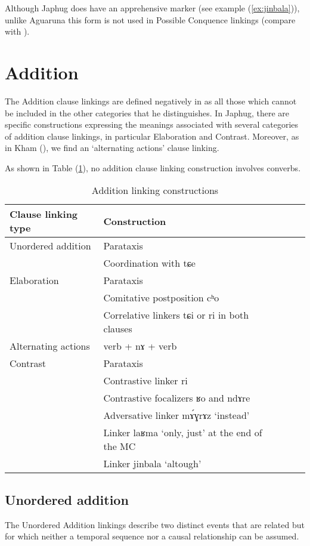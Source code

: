 \documentclass[oldfontcommands,oneside,a4paper,11pt]{article}
\newcommand{\ipa}[1]{{\phon \mbox{#1}}} %
\newcommand{\refb}[1]{(\ref{#1})}
\begin{document}
Although Japhug does have an apprehensive marker (see example \refb{ex:jinbala}), unlike Aguaruna this form is not used in Possible Conquence linkings  (compare with \citealt[187]{overall09linking}). 


\section{Addition}
The Addition clause linkings are defined negatively in \citet[26]{dixon09intro} as all those which cannot be included in the other categories that he distinguishes. In Japhug,    there are  specific constructions   expressing the meanings associated with several categories of addition clause linkings, in particular Elaboration and Contrast. Moreover, as in Kham (\citealt[113]{watters09kham}), we find an `alternating actions' clause linking.

As shown in Table \refb{tab:addition}, no addition clause linking construction involves converbs.

\begin{table}[h]
\caption{Addition linking constructions} \label{tab:addition}
\begin{tabular}{lllll}
\toprule
 Clause linking type &Construction \\
\midrule
Unordered addition &Parataxis   \\
  &Coordination with \ipa{tɕe}    \\
\midrule
Elaboration &Parataxis   \\
  &Comitative postposition \ipa{cʰo}     \\
    &Correlative linkers \ipa{tɕi} or \ipa{ri} in both clauses    \\
\midrule
Alternating actions & verb + \ipa{nɤ} + verb \\
\midrule
Contrast &Parataxis   \\
&Contrastive linker \ipa{ri}   \\
&Contrastive focalizers \ipa{ʁo}  and \ipa{ndɤre}  \\
&Adversative linker \ipa{mɤ́ɣrɤz} `instead' \\
&Linker \ipa{laʁma} `only, just' at the end of  the MC \\
&Linker \ipa{jinbala} `altough'   \\
\bottomrule
\end{tabular}
\end{table}


\subsection{Unordered addition} \label{sec:unordered}
The Unordered Addition linkings describe  two distinct events that are related but for which neither a temporal sequence nor a causal relationship can be assumed. 
\end{document}

